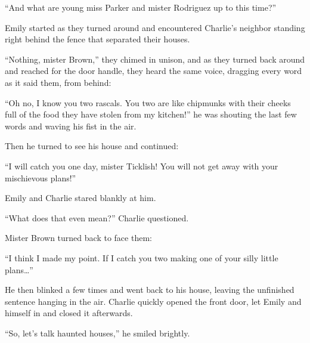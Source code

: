“And what are young miss Parker and mister Rodriguez up to this time?”

Emily started as they turned around and encountered Charlie’s neighbor standing right behind the fence that separated their houses.

“Nothing, mister Brown,” they chimed in unison, and as they turned back around and  reached for the door handle, they heard the same voice, dragging every word as it said them, from behind:

“Oh no, I know you two rascals. You two are like chipmunks with their cheeks full of the food they have stolen from my kitchen!” he was shouting the last few words and waving his fist in the air.

Then he turned to see his house and continued:

“I will catch you one day, mister Ticklish! You will not get away with your mischievous plans!”

Emily and Charlie stared blankly at him.
  
“What does that even mean?” Charlie questioned.

Mister Brown turned back to face them:

“I think I made my point. If I catch you two making one of your silly little plans…”

He then blinked a few times and went back to his house, leaving the unfinished sentence hanging in the air. Charlie quickly opened the front door, let Emily and himself in and closed it afterwards.

“So, let’s talk haunted houses,” he smiled brightly.